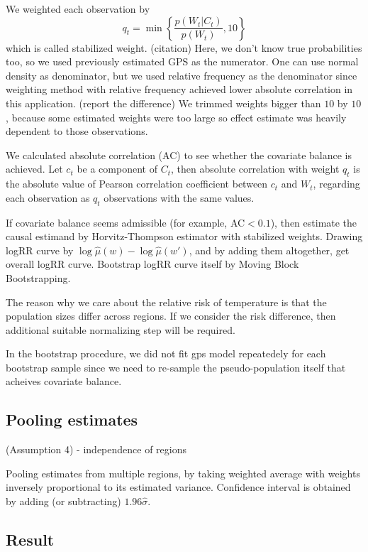 \documentclass[12pt]{article}
\begin{document}
We weighted each observation by 
\[
	q_t = \min{ \left \{ \frac{p(W_t \lvert C_t)}{p(W_t)}, 10 \right \} }
\]
which is called stabilized weight. (citation) %
Here, we don't know true probabilities too,
so we used previously estimated GPS as the numerator.
One can use normal density as denominator,
but we used relative frequency as the denominator
since weighting method with relative frequency achieved 
lower absolute correlation in this application. (report the difference)
We trimmed weights bigger than $10$ by $10$,
because some estimated weights were too large so
effect estimate was heavily dependent to those observations.

We calculated absolute correlation (AC)\cite{gpsboosting2015} 
to see whether the covariate balance is achieved.
Let $c_t$ be a component of $C_t$, then absolute correlation with weight $q_t$ is
the absolute value of Pearson correlation coefficient between $c_t$ and $W_t$,
regarding each observation as $q_t$ observations with the same values.

If covariate balance seems admissible (for example, AC$<0.1$), 
then estimate the causal estimand by Horvitz-Thompson estimator with stabilized weights.
Drawing logRR curve by $\log\hat{\mu}(w) - \log \hat{\mu}(w')$, 
and by adding them altogether, get overall logRR curve.
Bootstrap logRR curve itself by Moving Block Bootstrapping.\cite{mbb1989}

The reason why we care about the relative risk of temperature is
that the population sizes differ across regions.
If we consider the risk difference, then additional suitable normalizing step will be required.

In the bootstrap procedure, we did not fit gps model repeatedely for each bootstrap sample
since we need to re-sample the pseudo-population itself that acheives covariate balance.

\subsection{Pooling estimates}

(Assumption 4) - independence of regions

Pooling estimates from multiple regions, by taking weighted average with weights 
inversely proportional to its estimated variance.
Confidence interval is obtained by adding (or subtracting) $1.96 \hat{\sigma}$.

\subsection{Result}
\end{document}
